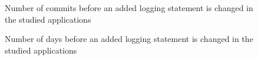 \begin{figure}[tb]
	
	\centering
	
	
	
	\caption{Number of commits before an added logging statement is changed in the studied applications } 
	\label{fig:NumberofCommits}
\end{figure}
\begin{figure}[tb]
	\setlength{\belowcaptionskip}{-10pt}
	\centering
	
	
	
	\caption{Number of days before an added logging statement is changed in the studied applications } 
	\label{fig:numberofdays}
\end{figure}

